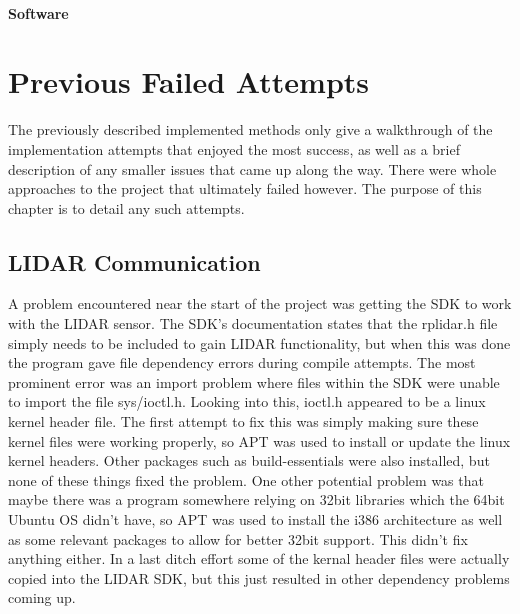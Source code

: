 				\subsubsection{Software}
				
	\chapter{Previous Failed Attempts}
	The previously described implemented methods only give a walkthrough of the implementation attempts that enjoyed the most success, as well as a brief description of any smaller issues that came up along the way. There were whole approaches to the project that ultimately failed however. The purpose of this chapter is to detail any such attempts.
		\section{LIDAR Communication}
		A problem encountered near the start of the project was getting the SDK to work with the LIDAR sensor. The SDK's documentation states that the rplidar.h file simply needs to be included to gain LIDAR functionality, but when this was done the program gave file dependency errors during compile attempts. The most prominent error was an import problem where files within the SDK were unable to import the file sys/ioctl.h. Looking into this, ioctl.h appeared to be a linux kernel header file. The first attempt to fix this was simply making sure these kernel files were working properly, so APT was used to install or update the linux kernel headers. Other packages such as build-essentials were also installed, but none of these things fixed the problem. One other potential problem was that maybe there was a program somewhere relying on 32bit libraries which the 64bit Ubuntu OS didn't have, so APT was used to install the i386 architecture as well as some relevant packages to allow for better 32bit support. This didn't fix anything either. In a last ditch effort some of the kernal header files were actually copied into the LIDAR SDK, but this just resulted in other dependency problems coming up.
		
